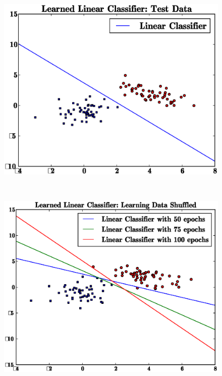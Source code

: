 \documentclass[letterpaper,10pt,titlepage]{article}
\begin{document}
\\[5mm]
\begin{figure}[th!]
\centering
\includegraphics[width=5in]{test.eps} 
\end{figure} 
\\[5mm] 
\pagebreak
\begin{figure}[th!]
\centering
\includegraphics[width=5in]{shuffled.eps} 
\end{figure} 
\\[5mm] 
\end{document}
